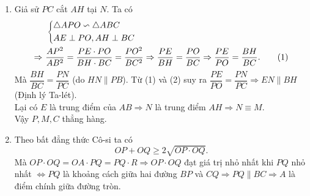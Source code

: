 \begin{bt}
{\begin{enumerate}
			$\Rightarrow PA=PB\Rightarrow \triangle OPA=\triangle OPB$ (c.g.c) $\Rightarrow \widehat{PAO}=\widehat{PBO}=90^\circ \Rightarrow PB\perp BO$\\
			$\Rightarrow PB$ là tiếp tuyến của đường tròn $(O)$.
			\item Giả sử $PC$ cắt $AH$ tại $N$. Ta có
			{\allowdisplaybreaks
				\begin{align}
				&\ \left\{\begin{aligned}& \triangle APO \backsim \triangle ABC \\ & AE \perp PO, AH \perp BC\end{aligned}\right. \nonumber\\
				\Rightarrow&\ \dfrac{AP^2}{AB^2}=\dfrac{PE\cdot PO}{BH \cdot BC}=\dfrac{PO^2}{BC^2} \Rightarrow \dfrac{PE}{BH}=\dfrac{PO}{BC}\Rightarrow \dfrac{PE}{PO}=\dfrac{BH}{BC}. \tag{1}
				\end{align}}
			Mà $\dfrac{BH}{BC}=\dfrac{PN}{PC}$ (do $HN\parallel PB$). 
			Từ (1) và (2) suy ra $\dfrac{PE}{PO}=\dfrac{PN}{PC}\Rightarrow EN\parallel BH$ (Định lý Ta-lét).\\
			Lại có $E$ là trung điểm của $AB\Rightarrow N$ là trung điểm $AH\Rightarrow N \equiv M$.\\
			Vậy $P,M,C$ thẳng hàng.
			\item Theo bất đẳng thức Cô-si ta có
			\[OP+OQ\geqslant 2\sqrt{OP\cdot OQ}.\]
			Mà $OP \cdot OQ = OA \cdot PQ = PQ\cdot R \Rightarrow OP\cdot OQ$ đạt giá trị nhỏ nhất khi $PQ$ nhỏ nhất $\Leftrightarrow PQ$ là khoảng cách giữa hai đường $BP$ và $CQ \Rightarrow PQ \parallel BC \Rightarrow A$ là điểm chính giữa đường tròn.
		\end{enumerate}
	}
\end{bt}

